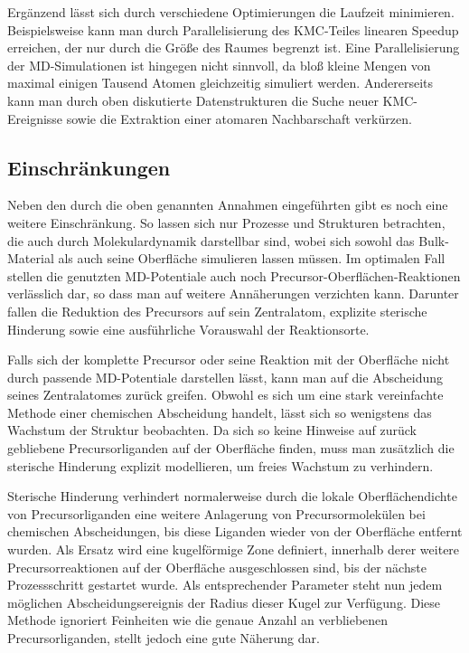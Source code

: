 Ergänzend lässt sich durch verschiedene Optimierungen die Laufzeit minimieren.
Beispielsweise kann man durch Parallelisierung des KMC-Teiles linearen Speedup  erreichen, der nur durch die Größe des Raumes begrenzt ist.
Eine Parallelisierung der MD-Simulationen ist hingegen nicht sinnvoll, da bloß kleine Mengen von maximal einigen Tausend Atomen gleichzeitig simuliert werden.
Andererseits kann man durch oben diskutierte Datenstrukturen die Suche neuer KMC-Ereignisse sowie die Extraktion einer atomaren Nachbarschaft verkürzen.


\subsection{Einschränkungen}

Neben den durch die oben genannten Annahmen  eingeführten gibt es noch eine weitere Einschränkung.
So lassen sich nur Prozesse und Strukturen betrachten, die auch durch Molekulardynamik darstellbar sind, wobei sich sowohl das Bulk-Material als auch seine Oberfläche simulieren lassen müssen.
Im optimalen Fall stellen die genutzten MD-Potentiale auch noch Precursor-Oberflächen-Reaktionen verlässlich dar, so dass man auf weitere Annäherungen verzichten kann.
Darunter fallen die Reduktion des Precursors auf sein Zentralatom, explizite sterische Hinderung sowie eine ausführliche Vorauswahl der Reaktionsorte.

Falls sich der komplette Precursor oder seine Reaktion mit der Oberfläche nicht durch passende MD-Potentiale darstellen lässt, kann man auf die Abscheidung seines Zentralatomes zurück greifen.
Obwohl es sich um eine stark vereinfachte Methode einer chemischen Abscheidung handelt, lässt sich so wenigstens das Wachstum der Struktur beobachten.
Da sich so keine Hinweise auf zurück gebliebene Precursorliganden auf der Oberfläche finden, muss man zusätzlich die sterische Hinderung explizit modellieren, um freies Wachstum zu verhindern.


Sterische Hinderung verhindert normalerweise durch die lokale Oberflächendichte von Precursorliganden eine weitere Anlagerung von Precursormolekülen bei chemischen Abscheidungen, bis diese Liganden wieder von der Oberfläche entfernt wurden.
Als Ersatz wird eine kugelförmige Zone definiert, innerhalb derer weitere Precursorreaktionen auf der Oberfläche ausgeschlossen sind, bis der nächste Prozessschritt gestartet wurde.
Als entsprechender Parameter steht nun jedem möglichen Abscheidungsereignis der Radius dieser Kugel zur Verfügung.
Diese Methode ignoriert Feinheiten wie die genaue Anzahl an verbliebenen Precursorliganden, stellt jedoch eine gute Näherung dar.

